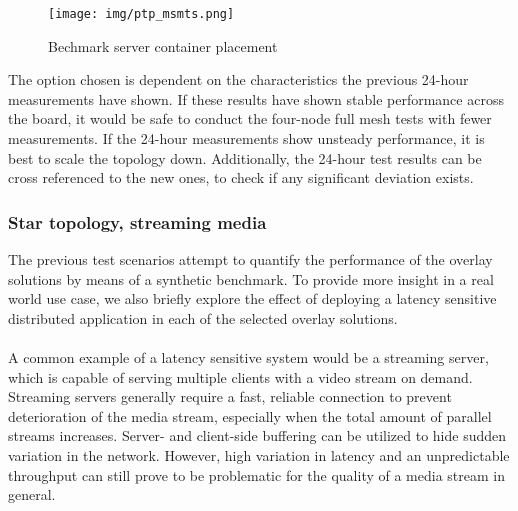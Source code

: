 \begin{figure}[H]
   \centering
   \texttt{[image: img/ptp\_msmts.png]}
   \caption{Bechmark server container placement}
   \label{fig:ptp_msmts}
\end{figure}

The option chosen is dependent on the characteristics the previous 24-hour measurements have shown. If these results have shown stable performance across the board, it would be safe to conduct the four-node full mesh tests with fewer measurements. If the 24-hour measurements show unsteady performance, it is best to scale the topology down. Additionally, the 24-hour test results can be cross referenced to the new ones, to check if any significant deviation exists.






\subsubsection{Star topology, streaming media} \label{startopo}
The previous test scenarios attempt to quantify the performance of the overlay solutions by means of a synthetic benchmark. To provide more insight in a real world use case, we also briefly explore the effect of deploying a latency sensitive distributed application in each of the selected overlay solutions. 
\\ \\
A common example of a latency sensitive system would be a streaming server, which is capable of serving multiple clients with a video stream on demand. Streaming servers generally require a fast, reliable connection to prevent deterioration of the media stream, especially when the total amount of parallel streams increases. Server- and client-side buffering can be utilized to hide sudden variation in the network. However, high variation in latency and an unpredictable throughput can still prove to be problematic for the quality of a media stream in general.

